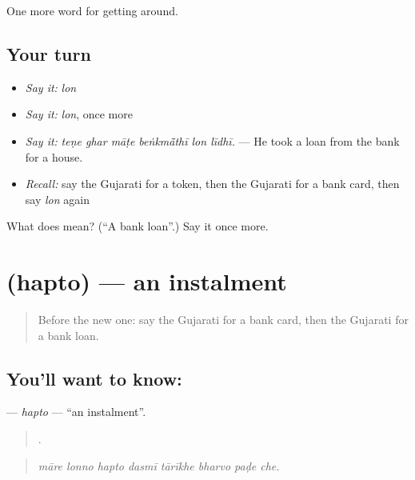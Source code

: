 \begin{grammarlens}[title={What you've built}]
One more word for getting around.
\end{grammarlens}

\subsection*{Your turn}
\begin{itemize}
\raggedright
  \item \emph{Say it:} \emph{lon}
  \item \emph{Say it:} \emph{lon}, once more
  \item \emph{Say it:} \emph{teṇe ghar māṭe beṅkmā̃thī lon līdhī.} — He took a loan from the bank for a house.
  \item \emph{Recall:} say the Gujarati for a token, then the Gujarati for a bank card, then say \emph{lon} again
\end{itemize}

\begin{tcolorbox}[breakable,colback=teal!4,colframe=teal!35!black,title={Before you move on}]
What does  mean? (\textquotedblleft{}A bank loan\textquotedblright{}.) Say it once more.
\end{tcolorbox}
\section[\texorpdfstring{\gu{હપતો} (hapto)}{હપતો (hapto)}]{ (hapto) — an instalment}

\label{lesson:GU-C425-hapto}



\begin{quote}
Before the new one: say the Gujarati for a bank card, then the Gujarati for a bank loan.
\end{quote}

\subsection*{You'll want to know: }
\textbf{} — \emph{hapto} — \textquotedblleft{}an instalment\textquotedblright{}.

\begin{quote}
       .
\end{quote}

\begin{quote}
\emph{māre lonno hapto dasmī tārīkhe bharvo paḍe che.}
\end{quote}

